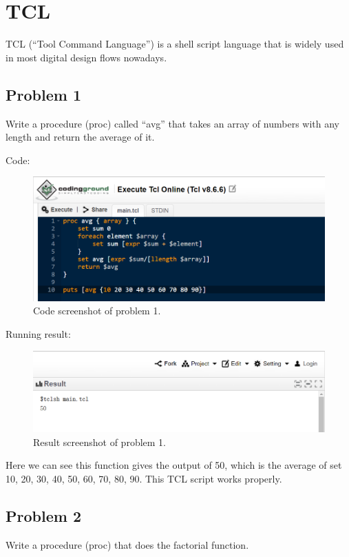 \documentclass[a4paper]{article}
\begin{document}
\section{TCL}
TCL (“Tool Command Language”) is a shell script language that is widely used in most digital design flows nowadays.
\subsection{Problem 1}
Write a procedure (proc) called “avg” that takes an array of numbers with any length and return the average of it.

Code: 
\begin{figure}[H]
    \centering
    \includegraphics[width=1\textwidth]{part2_1_code.png}
    \caption{Code screenshot of problem 1.}
\end{figure}
Running result:
\begin{figure}[H]
    \centering
    \includegraphics[width=1\textwidth]{part2_1_result.png}
    \caption{Result screenshot of problem 1.}
\end{figure}
Here we can see this function gives the output of 50, which is the average of set {10, 20, 30, 40, 50, 60, 70, 80, 90}. This TCL script works properly. 

\subsection{Problem 2}
Write a procedure (proc) that does the factorial function.
\end{document}
